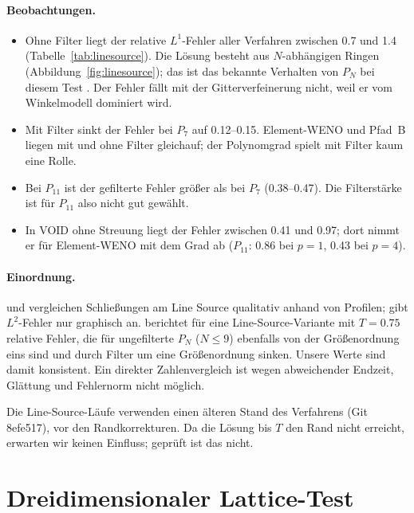 \paragraph{Beobachtungen.}
\begin{itemize}
  \item Ohne Filter liegt der relative $L^1$-Fehler aller Verfahren zwischen 0.7 und 1.4
        (Tabelle~\ref{tab:linesource}). Die Lösung besteht aus $N$-abhängigen Ringen
        (Abbildung~\ref{fig:linesource}); das ist das bekannte Verhalten von $P_N$ bei diesem
        Test \cite{garrett_hauck_2013,laiu_2016}. Der Fehler fällt mit der Gitterverfeinerung
        nicht, weil er vom Winkelmodell dominiert wird.
  \item Mit Filter sinkt der Fehler bei $P_7$ auf 0.12--0.15. Element-WENO und Pfad~B liegen
        mit und ohne Filter gleichauf; der Polynomgrad spielt mit Filter kaum eine Rolle.
  \item Bei $P_{11}$ ist der gefilterte Fehler größer als bei $P_7$ (0.38--0.47). Die
        Filterstärke ist für $P_{11}$ also nicht gut gewählt.
  \item In VOID ohne Streuung liegt der Fehler zwischen 0.41 und 0.97; dort nimmt er für
        Element-WENO mit dem Grad ab ($P_{11}$: 0.86 bei $p=1$, 0.43 bei $p=4$).
\end{itemize}

\paragraph{Einordnung.} \cite{garrett_hauck_2013} und \cite{laiu_2016} vergleichen Schließungen am
Line Source qualitativ anhand von Profilen; \cite{laiu_2016} gibt $L^2$-Fehler nur graphisch an.
\cite{plumridge_2025} berichtet für eine Line-Source-Variante mit $T=0.75$ relative Fehler, die für
ungefilterte $P_N$ ($N\le9$) ebenfalls von der Größenordnung eins sind und durch Filter um eine
Größenordnung sinken. Unsere Werte sind damit konsistent. Ein direkter Zahlenvergleich ist wegen
abweichender Endzeit, Glättung und Fehlernorm nicht möglich.

Die Line-Source-Läufe verwenden einen älteren Stand des Verfahrens (Git 8efe517), vor den
Randkorrekturen. Da die Lösung bis $T$ den Rand nicht erreicht, erwarten wir keinen Einfluss;
geprüft ist das nicht.

\section{Dreidimensionaler Lattice-Test}
\label{sec:tests:lattice3d}

